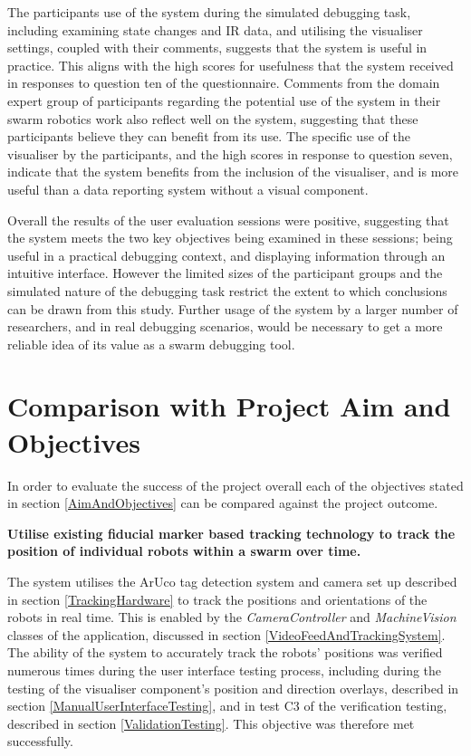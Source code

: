 The participants use of the system during the simulated debugging task, including examining state changes and IR data, and utilising the visualiser settings, coupled with their comments, suggests that the system is useful in practice. This aligns with the high scores for usefulness that the system received in responses to question ten of the questionnaire. Comments from the domain expert group of participants regarding the potential use of the system in their swarm robotics work also reflect well on the system, suggesting that these participants believe they can benefit from its use. The specific use of the visualiser by the participants, and the high scores in response to question seven, indicate that the system benefits from the inclusion of the visualiser, and is more useful than a data reporting system without a visual component.

Overall the results of the user evaluation sessions were positive, suggesting that the system meets the two key objectives being examined in these sessions; being useful in a practical debugging context, and displaying information through an intuitive interface. However the limited sizes of the participant groups and the simulated nature of the debugging task restrict the extent to which conclusions can be drawn from this study. Further usage of the system by a larger number of researchers, and in real debugging scenarios, would be necessary to get a more reliable idea of its value as a swarm debugging tool.


\section{Comparison with Project Aim and Objectives}

In order to evaluate the success of the project overall each of the objectives stated in section \ref{AimAndObjectives} can be compared against the project outcome.

\noindent \textbf{Utilise existing fiducial marker based tracking technology to track the position of individual robots within a swarm over time.}

The system utilises the ArUco tag detection system and camera set up described in section \ref{TrackingHardware} to track the positions and orientations of the robots in real time. This is enabled by the \textit{CameraController} and \textit{MachineVision} classes of the application, discussed in section \ref{VideoFeedAndTrackingSystem}. The ability of the system to accurately track the robots' positions was verified numerous times during the user interface testing process, including during the testing of the visualiser component's position and direction overlays, described in section \ref{ManualUserInterfaceTesting}, and in test C3 of the verification testing, described in section \ref{ValidationTesting}. This objective was therefore met successfully.

